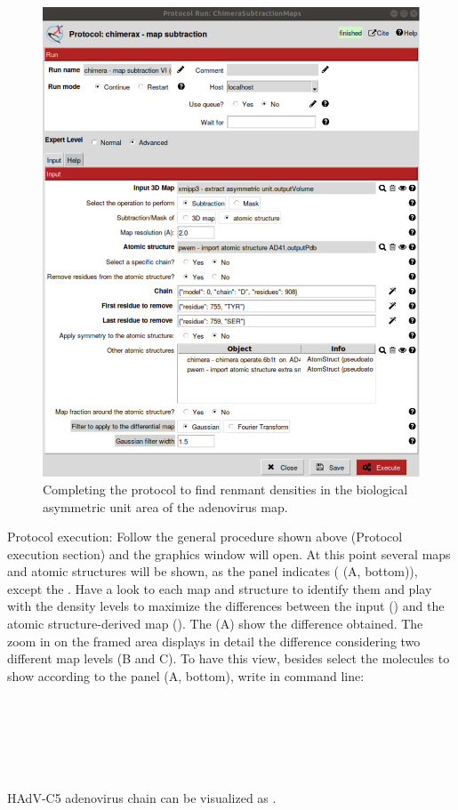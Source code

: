 \begin{itemize}
                            \begin{figure}[H]
                            \centering 
                            \captionsetup{width=.9\linewidth} 
                            \includegraphics[width=.50\textwidth]{Images_appendix/Fig313.pdf}
                            \caption{Completing the protocol  to find renmant densities in the biological asymmetric unit area of the adenovirus map.}  
                            \label{fig:app_usecase_mapsubtract_5}
                            \end{figure}
                            
                        Protocol execution: Follow the general procedure shown above (Protocol execution section) and the \chimera graphics window will open. At this point several maps and atomic structures will be shown, as the  panel indicates ( (A, bottom)), except the  . Have a look to each map and structure to identify them and play with the density levels to maximize the differences between the input  () and the  atomic structure-derived map (). The  (A) show the difference  obtained. The zoom in on the framed area displays in detail the difference considering two different map levels (B and C). To have this view, besides select the molecules to show according to the  panel (A, bottom), write in \chimera command line:\\
                        \\
                        \\
                        \\
                        \\
                        \\
                        \\
                        HAdV-C5 adenovirus chain  can be visualized as  .  
                        

\end{itemize}
